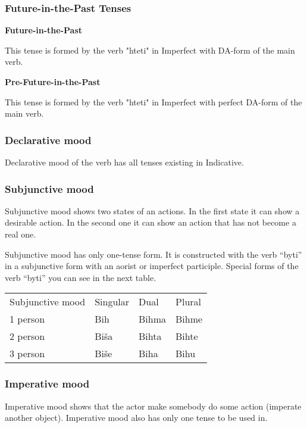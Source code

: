 \subsubsection{Future-in-the-Past Tenses}

\textbf{Future-in-the-Past}

This tense is formed by the verb "hteti" in Imperfect with DA-form of the main verb.

\textbf{Pre-Future-in-the-Past}

This tense is formed by the verb "hteti" in Imperfect with perfect DA-form of the main verb.

\subsubsection{Declarative mood}

Declarative mood of the verb has all tenses existing in Indicative.

\subsubsection{Subjunctive mood}

Subjunctive mood shows two states of an actions. In the first state it can show a desirable action. In the second one it can show an action that has not become a real one. 

Subjunctive mood has only one-tense form. It is constructed with the verb “byti” in a subjunctive form with an aorist or imperfect participle. Special forms of the verb “byti” you can see in the next table.

\begin{table}[!htb]
	\begin{tabular}{llll}
		Subjunctive mood & Singular & Dual & Plural \\
		1 person & Bih & Bihma & Bihme \\
		2 person & Biša & Bihta & Bihte \\
		3 person & Biše & Biha & Bihu
	\end{tabular}
\end{table}

\subsubsection{Imperative mood}

Imperative mood shows that the actor make somebody do some action (imperate another object). Imperative mood also has only one tense to be used in. 

